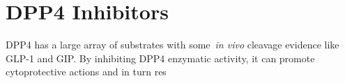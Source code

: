 \section{DPP4 Inhibitors}
DPP4 has a large array of substrates with some~\textit{in vivo} cleavage evidence like GLP-1 and GIP. By inhibiting DPP4 enzymatic activity, it can promote cytoprotective actions and in turn res